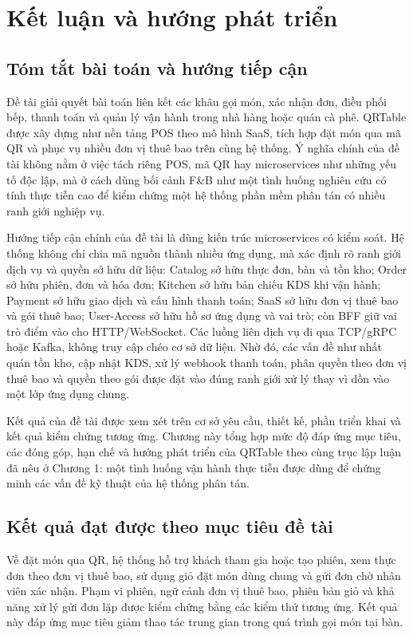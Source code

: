 \chapter{Kết luận và hướng phát triển}

\section{Tóm tắt bài toán và hướng tiếp cận}

Đề tài giải quyết bài toán liên kết các khâu gọi món, xác nhận đơn, điều phối bếp, thanh toán và quản lý vận hành trong nhà hàng hoặc quán cà phê. QRTable được xây dựng như nền tảng POS theo mô hình SaaS, tích hợp đặt món qua mã QR và phục vụ nhiều đơn vị thuê bao trên cùng hệ thống. Ý nghĩa chính của đề tài không nằm ở việc tách riêng POS, mã QR hay microservices như những yếu tố độc lập, mà ở cách dùng bối cảnh F\&B như một tình huống nghiên cứu có tính thực tiễn cao để kiểm chứng một hệ thống phần mềm phân tán có nhiều ranh giới nghiệp vụ.

Hướng tiếp cận chính của đề tài là dùng kiến trúc microservices có kiểm soát. Hệ thống không chỉ chia mã nguồn thành nhiều ứng dụng, mà xác định rõ ranh giới dịch vụ và quyền sở hữu dữ liệu: Catalog sở hữu thực đơn, bàn và tồn kho; Order sở hữu phiên, đơn và hóa đơn; Kitchen sở hữu bản chiếu KDS khi vận hành; Payment sở hữu giao dịch và cấu hình thanh toán; SaaS sở hữu đơn vị thuê bao và gói thuê bao; User-Access sở hữu hồ sơ ứng dụng và vai trò; còn BFF giữ vai trò điểm vào cho HTTP/WebSocket. Các luồng liên dịch vụ đi qua TCP/gRPC hoặc Kafka, không truy cập chéo cơ sở dữ liệu. Nhờ đó, các vấn đề như nhất quán tồn kho, cập nhật KDS, xử lý webhook thanh toán, phân quyền theo đơn vị thuê bao và quyền theo gói được đặt vào đúng ranh giới xử lý thay vì dồn vào một lớp ứng dụng chung.

Kết quả của đề tài được xem xét trên cơ sở yêu cầu, thiết kế, phần triển khai và kết quả kiểm chứng tương ứng. Chương này tổng hợp mức độ đáp ứng mục tiêu, các đóng góp, hạn chế và hướng phát triển của QRTable theo cùng trục lập luận đã nêu ở Chương 1: một tình huống vận hành thực tiễn được dùng để chứng minh các vấn đề kỹ thuật của hệ thống phân tán.

\section{Kết quả đạt được theo mục tiêu đề tài}

Về đặt món qua QR, hệ thống hỗ trợ khách tham gia hoặc tạo phiên, xem thực đơn theo đơn vị thuê bao, sử dụng giỏ đặt món dùng chung và gửi đơn chờ nhân viên xác nhận. Phạm vi phiên, ngữ cảnh đơn vị thuê bao, phiên bản giỏ và khả năng xử lý gửi đơn lặp được kiểm chứng bằng các kiểm thử tương ứng. Kết quả này đáp ứng mục tiêu giảm thao tác trung gian trong quá trình gọi món tại bàn.

